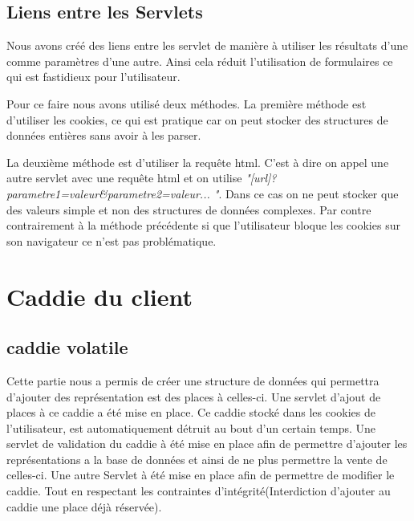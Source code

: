 ﻿\documentclass[12pt]{article}
\begin{document}
\subsection{Liens entre les Servlets}

Nous avons créé des liens entre les servlet de manière à utiliser les résultats d'une comme paramètres d'une autre. Ainsi cela réduit l'utilisation de formulaires ce qui est fastidieux pour l'utilisateur.

Pour ce faire nous avons utilisé deux méthodes. La première méthode est d'utiliser les cookies, ce qui est pratique car on peut stocker des structures de données entières sans avoir à les parser.

La deuxième méthode est d'utiliser la requête html. C'est à dire on appel une autre servlet avec une requête html et on utilise \emph{"[url]?parametre1=valeur\&parametre2=valeur... "}. Dans ce cas on ne peut stocker que des valeurs simple et non des structures de données complexes. Par contre contrairement à la méthode précédente si que l'utilisateur bloque les cookies sur son navigateur ce n'est pas problématique.


\section{Caddie du client}
 
\subsection{caddie volatile}
Cette partie nous a permis de créer une structure de données qui permettra d'ajouter des représentation est des places à celles-ci.
Une servlet d'ajout de places à ce caddie a été mise en place. Ce caddie stocké dans les cookies de l'utilisateur, est automatiquement détruit au bout d'un certain temps.
Une servlet de validation du caddie à été mise en place afin de permettre d'ajouter les représentations a la base de données et ainsi de ne plus permettre la vente de celles-ci.
Une autre Servlet à été mise en place afin de permettre de modifier le caddie. Tout en respectant les  contraintes d'intégrité(Interdiction d'ajouter au caddie une place déjà réservée).
\end{document}
